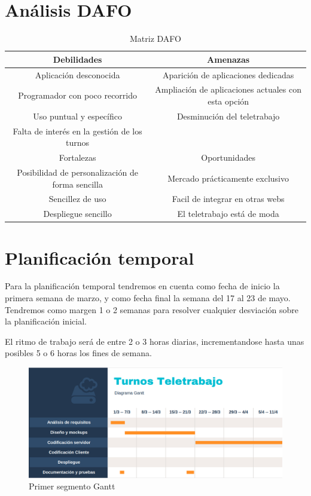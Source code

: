 \documentclass[11pt,spanish,listoffigures,listoftables]{tfgetsinf}
\begin{document}
\section{Análisis DAFO}
\begin{table} 
\begin{center}
\begin{tabular}{| c | c |}
\hline
Debilidades & Amenazas \\ \hline
\tiny Aplicación desconocida & \tiny Aparición de aplicaciones dedicadas \\
\tiny Programador con poco recorrido & \tiny Ampliación de aplicaciones actuales con esta opción \\
\tiny Uso puntual y específico & \tiny Desminución del teletrabajo\\
\tiny Falta de interés en la gestión de los turnos &  \\ \hline   
\normalsize
Fortalezas & Oportunidades \\ \hline
\tiny Posibilidad de personalización de forma sencilla & \tiny Mercado prácticamente exclusivo \\
\tiny Sencillez de uso &  \tiny Facil de integrar en otras webs\\
\tiny Despliegue sencillo & \tiny El teletrabajo está de moda \\
\hline
\end{tabular}
\caption{Matriz DAFO}
\label{table:1}
\end{center}
\end{table}
\section{Planificación temporal}
Para la planificación temporal tendremos en cuenta como fecha de inicio la primera semana de marzo, y como fecha final la semana del 17 al 23 de mayo.
Tendremos como margen 1 o 2 semanas para resolver cualquier desviación sobre la planificación inicial.

El ritmo de trabajo será de entre 2 o 3 horas diarias, incrementandose hasta unas posibles 5 o 6 horas los fines de semana. 


\begin{figure}[h!] %
   \includegraphics[width=\linewidth]{img/gantt1.png}
   \caption{Primer segmento Gantt}
   \label{fig:Gantt1}
 \end{figure}
\end{document}

